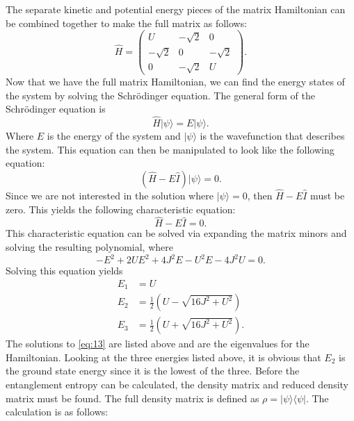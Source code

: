 \noindent The separate kinetic and potential energy pieces of the matrix Hamiltonian can be combined together to make the full matrix as follows:
\begin{equation}
\hat{H} = \begin{pmatrix} U & -\sqrt{2} & 0 \\ -\sqrt{2} & 0 & -\sqrt{2} \\ 0 & -\sqrt{2} & U \end{pmatrix}.
\end{equation}
\noindent Now that we have the full matrix Hamiltonian, we can find the energy states of the system by solving the Schr\"{o}dinger equation. The general form of the Schr\"{o}dinger equation is
\begin{equation}
\hat{H}|\psi\rangle = E|\psi\rangle.
\end{equation}
\noindent Where $E$ is the energy of the system and $|\psi\rangle$ is the wavefunction that describes the system.
\noindent This equation can then be manipulated to look like the following equation:
\begin{equation}
\left( \hat{H}-E\hat{I} \right) |\psi\rangle = 0.
\end{equation}
\noindent Since we are not interested in the solution where $|\psi\rangle=0$, then $\hat{H}-E\hat{I}$ must be zero. This yields the following characteristic equation:
\begin{equation}
\hat{H}-E\hat{I} = 0.
\end{equation}
\noindent This characteristic equation can be solved via expanding the matrix minors and solving the resulting polynomial, where
\begin{equation}
-E^2 + 2UE^2 + 4J^2E - U^2E - 4J^2U = 0.
\label{eq:13}
\end{equation}
\noindent Solving this equation yields 
\begin{align*}
E_1 &= U \\
E_2 &= \frac{1}{2} \left( U - \sqrt{16J^2 + U^2} \right) \\
E_3 &= \frac{1}{2} \left( U + \sqrt{16J^2 + U^2} \right).
\end{align*}
\noindent The solutions to \cref{eq:13} are listed above and are the eigenvalues for the Hamiltonian.  Looking at the three energies listed above, it is obvious that $E_2$ is the ground state energy since it is the lowest of the three. Before the entanglement entropy can be calculated, the density matrix and reduced density matrix must be found. The full density matrix is defined as $\rho = |\psi \rangle \langle \psi|$. The calculation is as follows:
